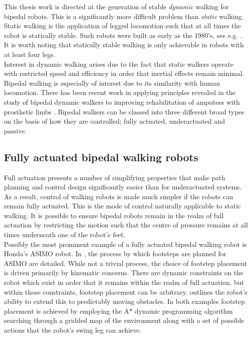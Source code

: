 This thesis work is directed at the generation of stable \textit{dynamic} walking for bipedal robots. This is a significantly more difficult problem than \textit{static} walking. Static walking is the application of legged locomotion such that at all times the robot is statically stable. Such robots were built as early as the 1980's, see e.g. \cite{russell1983odex, waldron1986adaptive}. It is worth noting that statically stable walking is only achievable in robots with at least four legs.\\

Interest in dynamic walking arises due to the fact that static walkers operate with restricted speed and efficiency in order that inertial effects remain minimal. Bipedal walking is especially of interest due to its similarity with human locomotion. There has been recent work in applying principles revealed in the study of bipedal dynamic walkers to improving rehabilitation of amputees with prosthetic limbs \cite{martinpredicting}. Bipedal walkers can be classed into three different broad types on the basis of how they are controlled; fully actuated, underactuated and passive.

\subsection{Fully actuated bipedal walking robots}
Full actuation presents a number of simplifying properties that make path planning and control design significantly easier than for underactuated systems. As a result, control of walking robots is made much simpler if the robots can remain fully actuated. This is the mode of control naturally applicable to static walking. It is possible to ensure bipedal robots remain in the realm of full actuation by restricting the motion such that the centre of pressure remains at all times underneath one of the robot's feet. \\

Possibly the most prominent example of a fully actuated bipedal walking robot is Honda's ASIMO robot. In \cite{chestnutt2005footstep}, the process by which footsteps are planned for ASIMO are detailed. While not a trivial process, the choice of footstep placement is driven primarily by kinematic concerns. There are dynamic constraints on the robot which exist in order that it remains within the realm of full actuation, but within those constraints, footstep placement can be arbitrary. \cite{chestnutt2007locomotion} outlines the robot's ability to extend this to predictably moving obstacles. In both examples footstep placement is achieved by employing the A* dynamic programming algorithm searching through a gridded map of the environment along with a set of possible actions that the robot's swing leg can achieve. \\


